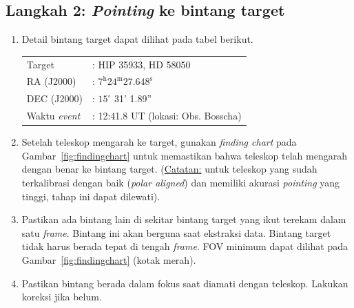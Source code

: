 \documentclass[12pt,a4paper]{article}
\begin{document}
\subsection*{Langkah 2: \textit{Pointing} ke bintang target}
\begin{enumerate}
	\item Detail bintang target dapat dilihat pada tabel berikut.
	\begin{table}[H]
		\centering
		\large
		\begin{tabular}{ll}
			\toprule
			Target &: HIP 35933, HD 58050  \\
			RA (J2000) &: $7^\mathrm{h} 24^\mathrm{m} 27.648^\mathrm{s}$  \\
			DEC (J2000) &: $15^\circ$ 31' 1.89''  \\
			Waktu \textit{event} &: 12:41.8 UT (lokasi: Obs. Bosscha) \\
			\bottomrule
		\end{tabular}
	\end{table}
	\item Setelah teleskop mengarah ke target, gunakan \textit{finding chart} pada Gambar~\ref{fig:findingchart} untuk memastikan bahwa teleskop telah mengarah dengan benar ke bintang target. (\underline{Catatan:} untuk teleskop yang sudah terkalibrasi dengan baik (\textit{polar aligned}) dan memiliki akurasi \textit{pointing} yang tinggi, tahap ini dapat dilewati).
	\item Pastikan ada bintang lain di sekitar bintang target yang ikut terekam dalam satu \textit{frame}. Bintang ini akan berguna saat ekstraksi data. Bintang target tidak harus berada tepat di tengah \textit{frame}. FOV minimum dapat dilihat pada Gambar~\ref{fig:findingchart} (kotak merah). 
	\item Pastikan bintang berada dalam fokus saat diamati dengan teleskop. Lakukan koreksi jika belum.
\end{enumerate}
\end{document}
